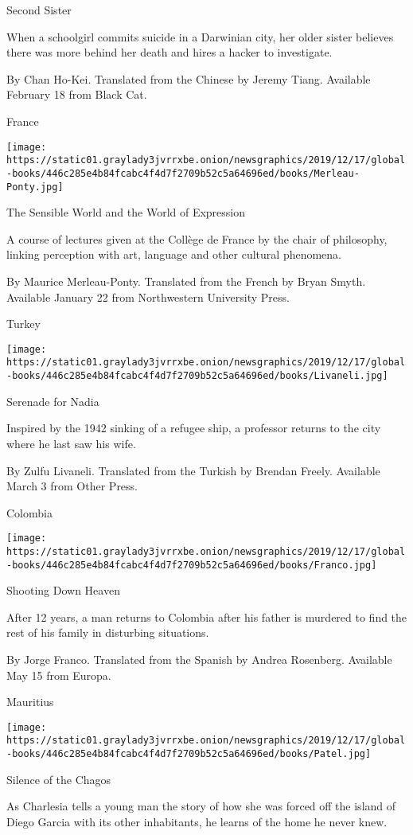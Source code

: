 Second Sister

When a schoolgirl commits suicide in a Darwinian city, her older sister
believes there was more behind her death and hires a hacker to
investigate.

 By Chan Ho-Kei. Translated from the Chinese by Jeremy Tiang. Available
February 18 from Black Cat.

France

\texttt{[image: https://static01.graylady3jvrrxbe.onion/newsgraphics/2019/12/17/global-books/446c285e4b84fcabc4f4d7f2709b52c5a64696ed/books/Merleau-Ponty.jpg]}

The Sensible World and the World of Expression

A course of lectures given at the Collège de France by the chair of
philosophy, linking perception with art, language and other cultural
phenomena.

 By Maurice Merleau-Ponty. Translated from the French by Bryan Smyth.
Available January 22 from Northwestern University Press.

Turkey

\texttt{[image: https://static01.graylady3jvrrxbe.onion/newsgraphics/2019/12/17/global-books/446c285e4b84fcabc4f4d7f2709b52c5a64696ed/books/Livaneli.jpg]}

Serenade for Nadia

Inspired by the 1942 sinking of a refugee ship, a professor returns to
the city where he last saw his wife.

 By Zulfu Livaneli. Translated from the Turkish by Brendan Freely.
Available March 3 from Other Press.

Colombia

\texttt{[image: https://static01.graylady3jvrrxbe.onion/newsgraphics/2019/12/17/global-books/446c285e4b84fcabc4f4d7f2709b52c5a64696ed/books/Franco.jpg]}

Shooting Down Heaven

After 12 years, a man returns to Colombia after his father is murdered
to find the rest of his family in disturbing situations.

 By Jorge Franco. Translated from the Spanish by Andrea Rosenberg.
Available May 15 from Europa.

Mauritius

\texttt{[image: https://static01.graylady3jvrrxbe.onion/newsgraphics/2019/12/17/global-books/446c285e4b84fcabc4f4d7f2709b52c5a64696ed/books/Patel.jpg]}

Silence of the Chagos

As Charlesia tells a young man the story of how she was forced off the
island of Diego Garcia with its other inhabitants, he learns of the home
he never knew.

